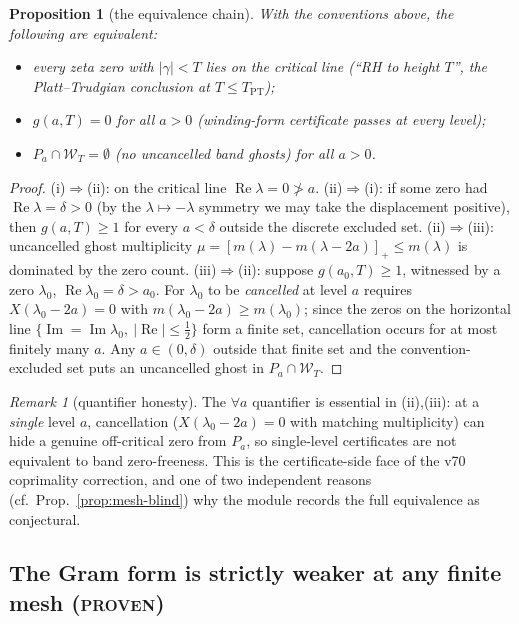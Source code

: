 \documentclass[11pt]{article}
\newtheorem{proposition}[theorem]{Proposition}
\theoremstyle{definition}
\theoremstyle{remark}
\newtheorem{remark}[theorem]{Remark}
\newcommand{\re}{\operatorname{Re}}
\newcommand{\im}{\operatorname{Im}}
\newcommand{\band}[1]{\mathcal{W}_{#1}}
\newcommand{\TPT}{T_{\mathrm{PT}}}
\begin{document}
\begin{proposition}[the equivalence chain]\label{prop:equivalences}
With the conventions above, the following are equivalent:
\begin{itemize}
\item[(i)] every zeta zero with $|\gamma|<T$ lies on the critical line
(``RH to height $T$'', the Platt--Trudgian conclusion at $T\le\TPT$);
\item[(ii)] $g(a,T)=0$ for all $a>0$ (winding-form certificate passes at
every level);
\item[(iii)] $P_a\cap\band{T}=\emptyset$ (no uncancelled band ghosts) for
all $a>0$.
\end{itemize}
\end{proposition}

\begin{proof}
(i)$\Rightarrow$(ii): on the critical line $\re\lambda=0\not>a$.
(ii)$\Rightarrow$(i): if some zero had $\re\lambda=\delta>0$ (by the
$\lambda\mapsto-\lambda$ symmetry we may take the displacement positive),
then $g(a,T)\ge1$ for every $a<\delta$ outside the discrete excluded set.
(ii)$\Rightarrow$(iii): uncancelled ghost multiplicity
$\mu=[m(\lambda)-m(\lambda-2a)]_+\le m(\lambda)$ is dominated by the zero
count. (iii)$\Rightarrow$(ii): suppose $g(a_0,T)\ge1$, witnessed by a zero
$\lambda_0$, $\re\lambda_0=\delta>a_0$. For $\lambda_0$ to be \emph{cancelled}
at level $a$ requires $X(\lambda_0-2a)=0$ with
$m(\lambda_0-2a)\ge m(\lambda_0)$; since the zeros on the horizontal line
$\{\im=\im\lambda_0,\ |\re|\le\tfrac12\}$ form a finite set, cancellation
occurs for at most finitely many $a$. Any $a\in(0,\delta)$ outside that
finite set and the convention-excluded set puts an uncancelled ghost in
$P_a\cap\band{T}$.
\end{proof}

\begin{remark}[quantifier honesty]\label{rem:quantifier}
The $\forall a$ quantifier is essential in (ii),(iii): at a \emph{single}
level $a$, cancellation ($X(\lambda_0-2a)=0$ with matching multiplicity) can
hide a genuine off-critical zero from $P_a$, so single-level certificates are
not equivalent to band zero-freeness. This is the certificate-side face of
the v70 coprimality correction, and one of two independent reasons
(cf.\ Prop.~\ref{prop:mesh-blind}) why the module records the full
equivalence as conjectural.
\end{remark}

\subsection{The Gram form is strictly weaker at any finite mesh
(\textsc{proven})}
\end{document}
